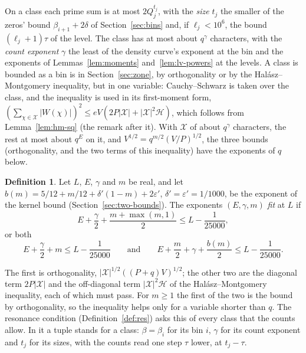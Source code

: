 \documentclass[11pt]{article}
\theoremstyle{definition}
\newtheorem{definition}[theorem]{Definition}
\begin{document}
On a class each prime sum is at most $2Q_j^{t_j}$, with the \emph{size} $t_j$ the smaller of the zeros' bound
$\beta_{i+1} + 2\delta$ of Section~\ref{sec:bins} and, if $\ell_j < 10^6$, the bound $(\ell_j + 1)\tau$ of the level.
The class has at most about $q^\gamma$ characters, with the \emph{count exponent} $\gamma$ the least of
the density curve's exponent at the bin and the exponents of Lemmas~\ref{lem:moments} and~\ref{lem:lv-powers} at the
levels. A class is bounded as a bin is in Section~\ref{sec:zone}, by orthogonality or by the Hal\'asz--Montgomery
inequality, but in one variable: Cauchy--Schwarz is taken over the class, and the inequality is used in its first-moment
form, $(\sum_{\chi \in \mathcal X} |W(\chi)|)^2 \le eV(2P|\mathcal X| + |\mathcal X|^2 \mathcal H)$, which follows from
Lemma~\ref{lem:hm-sq} (the remark after it). With $\mathcal X$ of about $q^\gamma$ characters, the rest at most about
$q^E$ on it, and $V^{1/2} = q^{m/2}(V/P)^{1/2}$, the three bounds (orthogonality, and the two terms of this
inequality) have the exponents of $q$ below.

\begin{definition}\label{def:fit}
Let $L$, $E$, $\gamma$ and $m$ be real, and let $b(m) = 5/12 + m/12 + \delta'(1 - m) + 2\varepsilon'$, $\delta' =
\varepsilon' = 1/1000$, be the exponent of the kernel bound (Section~\ref{sec:two-bounds}). The exponents $(E,
\gamma, m)$ \emph{fit} at $L$ if
\[
  E + \frac\gamma2 + \frac{m + \max(m, 1)}2 \le L - \frac1{25000},
\]
or both
\[
  E + \frac\gamma2 + m \le L - \frac1{25000} \qquad \text{and} \qquad E + \frac m2 + \gamma + \frac{b(m)}2 \le L -
  \frac1{25000}.
\]
\end{definition}

The first is orthogonality, $|\mathcal X|^{1/2}((P + q)V)^{1/2}$; the other two are the diagonal term $2P|\mathcal X|$
and the off-diagonal term $|\mathcal X|^2 \mathcal H$ of the Hal\'asz--Montgomery inequality, each of which must pass.
For $m \ge 1$ the first of the two is the bound by orthogonality, so the inequality helps only for a variable shorter
than $q$. The resonance condition (Definition~\ref{def:res}) asks this of every class that the counts allow. In it a
tuple stands for a class: $\beta = \beta_i$ for its bin $i$, $\gamma$ for its count exponent and $t_j$ for its sizes,
with the counts read one step $\tau$ lower, at $t_j - \tau$.
\end{document}
